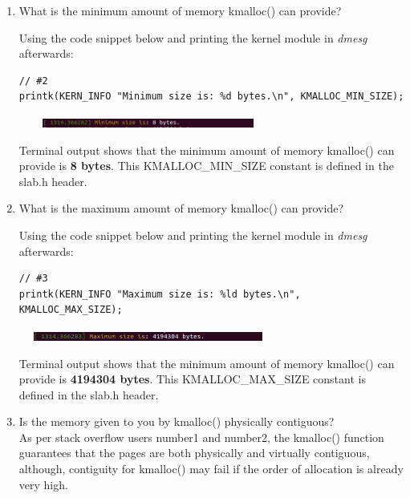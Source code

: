 \documentclass[conference]{IEEEtran}
\newcommand\tab[1][0.5cm]{\hspace*{#1}}
\begin{document}
\begin{enumerate}

\item What is the minimum amount of memory kmalloc() can provide?

\tab Using the code snippet below and printing the kernel module in \textit{dmesg} afterwards:
	\begin{lstlisting}
// #2
printk(KERN_INFO "Minimum size is: %d bytes.\n", KMALLOC_MIN_SIZE);
	\end{lstlisting}
	\begin{center}
		\includegraphics[width=8.5cm, height=0.3cm]{memory3.jpg}
	\end{center}
\tab Terminal output shows that the minimum amount of memory kmalloc() can provide is \textbf{8 bytes}. This KMALLOC\_MIN\_SIZE constant is defined in the slab.h header. \\

\item What is the maximum amount of memory kmalloc() can provide?

\tab Using the code snippet below and printing the kernel module in \textit{dmesg} afterwards:
\begin{lstlisting}
// #3
printk(KERN_INFO "Maximum size is: %ld bytes.\n", KMALLOC_MAX_SIZE);
\end{lstlisting}
\begin{center}
	\includegraphics[width=8.5cm, height=0.3cm]{memory4.jpg}
\end{center}
\tab Terminal output shows that the minimum amount of memory kmalloc() can provide is \textbf{4194304 bytes}. This KMALLOC\_MAX\_SIZE constant is defined in the slab.h header. \\

\item Is the memory given to you by kmalloc() physically contiguous? \\
\tab As per stack overflow users number1 and number2, the kmalloc() function guarantees that the pages are both physically and virtually contiguous, although, contiguity for kmalloc() may fail if the order of allocation is already very high.
\end{enumerate}
\end{document}
